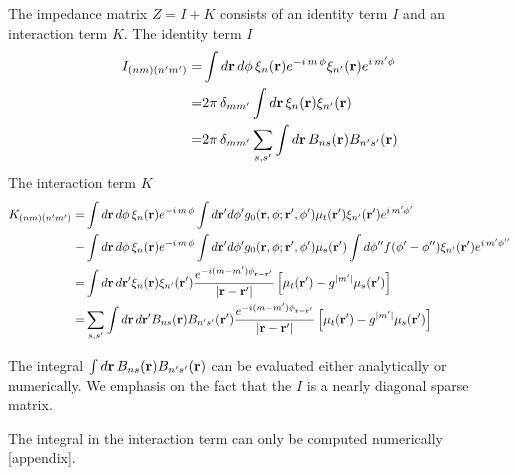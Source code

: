 \documentclass[main]{subfiles}
\begin{document}
The impedance matrix $Z=I+K$ consists of an identity term $I$ and an interaction
term $K$. The identity term $I$
\begin{equation*}
	\begin{split} 
		I_{(nm)(n^{\prime} m^{\prime})} =& \int d\mathbf{r}\,d\phi \,\xi_n(\mathbf{r})
		e^{-i\,m\,\phi}\xi_{n^{\prime}}(\mathbf{r})e^{i\,m^{\prime}\phi} \\
		=& 2\pi\,\delta_{mm^{\prime}}\int d\mathbf{r}\,\xi_n(\mathbf{r})\xi_{n^{\prime}}(\mathbf{r})
		\\ =& 2\pi\,\delta_{mm^{\prime}}\sum\limits_{s,s^{\prime}} 
		\int d\mathbf{r}\,B_{ns}(\mathbf{r})B_{n^{\prime} s^{\prime}}(\mathbf{r})
	\end{split}
\end{equation*}
The interaction term $K$
\begin{equation*}
	\begin{split}
		K_{(nm)(n^{\prime} m^{\prime})} =& \int d\mathbf{r}\,d\phi\,\xi_n(\mathbf{r})
		e^{-i\,m\,\phi} \int d\mathbf{r}^{\prime} d\phi^{\prime}
		g_0(\mathbf{r},\phi;\mathbf{r}^{\prime},\phi^{\prime}) \mu_t(\mathbf{r}^{\prime}) 
		\xi_{n^{\prime}}(\mathbf{r}^{\prime}) e^{i\,m^{\prime}\phi^{\prime}} \\
		-& \int d\mathbf{r}\,d\phi\,\xi_n(\mathbf{r}) e^{-i\,m\,\phi} 
		\int d\mathbf{r}^{\prime} d\phi^{\prime} g_0(\mathbf{r},\phi;\mathbf{r}^{\prime},\phi^{\prime}) 
		\mu_s(\mathbf{r}^{\prime}) \int d\phi^{{\prime\prime}} f(\phi^{\prime}-\phi^{{\prime\prime}})
		\xi_{n^{\prime}}(\mathbf{r^{\prime}}) e^{i\,m^{\prime} \phi^{{\prime\prime}}} \\
		=& \int d\mathbf{r}\,d\mathbf{r}^{\prime} \xi_n(\mathbf{r}) \xi_{n^{\prime}}(\mathbf{r}^{\prime})
		\frac{e^{-i(m-m^{\prime})\phi_{\mathbf{r}-\mathbf{r}^{\prime}}}}
		{\left\vert \mathbf{r}-\mathbf{r}^{\prime} \right\vert}
		\left[ \mu_t(\mathbf{r}^{\prime})-g^{|m^{\prime}|}\mu_s(\mathbf{r}^{\prime})\right] \\
		=& \sum\limits_{s,s^{\prime}} 
		\int d\mathbf{r}\,d\mathbf{r}^{\prime} B_{ns}(\mathbf{r}) B_{n^{\prime} s^{\prime}}(\mathbf{r}^{\prime})
		\frac{e^{-i(m-m^{\prime})\phi_{\mathbf{r}-\mathbf{r}^{\prime}}}}
		{\left\vert \mathbf{r}-\mathbf{r}^{\prime} \right\vert}
		\left[ \mu_t(\mathbf{r}^{\prime})-g^{|m^{\prime}|}\mu_s(\mathbf{r}^{\prime})\right]
	\end{split}
\end{equation*}

The integral $\int d\mathbf{r}\,B_{ns}(\mathbf{r})B_{n^{\prime} s^{\prime}}(\mathbf{r})$ can be evaluated
either analytically or numerically. We emphasis on the fact that the $I$ is a
nearly diagonal sparse matrix.

The integral in the interaction term can only be computed numerically [appendix].  
\end{document}
